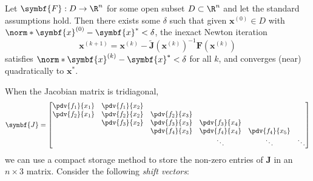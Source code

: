\documentclass{article}
\begin{document}
\begin{theorem}
    Let \(\symbf{F} : D \to \R^n\) for some open subset \(D \subset \R^n\)
    and let the standard assumptions hold. Then there exists some \(\delta\)
    such that given \(\symbf{x}^{\left( 0 \right)} \in D\) with
    \(\norm*{\symbf{x}^{\left( 0 \right)} - \symbf{x}^\ast} < \delta\),
    the inexact Newton iteration
    \begin{equation*}
        \symbf{x}^{\left( k + 1 \right)} = \symbf{x}^{\left( k \right)} - \tilde{\symbf{J}}\left( \symbf{x}^{\left( k \right)} \right)^{-1} \symbf{F}\left( \symbf{x}^{\left( k \right)} \right)
    \end{equation*}
    satisfies \(\norm*{\symbf{x}^{\left( k \right)} - \symbf{x}^\ast} < \delta\)
    for all \(k\), and converges (near) quadratically to \(\symbf{x}^\ast\).
\end{theorem}
When the Jacobian matrix is tridiagonal,
\begin{equation*}
    \symbf{J} =
    \begin{bmatrix}
        \pdv{f_1}{x_1} & \pdv{f_1}{x_2}                                                             \\
        \pdv{f_2}{x_1} & \pdv{f_2}{x_2} & \pdv{f_2}{x_3}                                            \\
                       & \pdv{f_3}{x_2} & \pdv{f_3}{x_3} & \pdv{f_3}{x_4}                           \\
                       &                & \pdv{f_4}{x_3} & \pdv{f_4}{x_4} & \pdv{f_4}{x_5}          \\
                       &                &                & \ddots         & \ddots         & \ddots \\
    \end{bmatrix}
\end{equation*}
we can use a compact storage
method to store the non-zero entries of \(\symbf{J}\) in an \(n \times 3\)
matrix. Consider the following \textit{shift vectors}:
\end{document}
